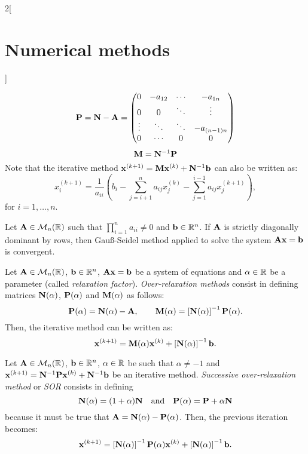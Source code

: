 \documentclass[../../../main.tex]{subfiles}
\begin{document}
\begin{multicols}{2}[\section{Numerical methods}]
\begin{definition}
\begin{equation*}
        \vb{P}=\vb{N}-\vb{A}=
        \begin{pmatrix}
            0 & -a_{12} & \cdots & -a_{1n}\\
            0 & 0 & \ddots & \vdots\\
            \vdots & \ddots & \ddots & -a_{(n-1)n}\\
            0 & \cdots & 0 & 0
        \end{pmatrix}
    \end{equation*}
    \begin{equation*}
        \vb{M}=\vb{N}^{-1}\vb{P}
    \end{equation*}
    Note that the iterative method $\vb{x}^{(k+1)}=\vb{M}\vb{x}^{(k)}+\vb{N}^{-1}\vb{b}$ can also be written as: $$x_i^{(k+1)}=\frac{1}{a_{ii}}\left(b_i-\sum_{j=i+1}^na_{ij}x_j^{(k)}-\sum_{j=1}^{i-1}a_{ij}x_j^{(k+1)}\right),$$ for $i=1,\ldots,n$.
\end{definition}
\begin{theorem}
    Let $\vb{A}\in\mathcal{M}_n(\mathbb{R})$ such that $\prod_{i=1}^na_{ii}\ne 0$ and $\vb{b}\in\mathbb{R}^n$. If $\vb{A}$ is strictly diagonally dominant by rows, then Gau\ss-Seidel method applied to solve the system $\vb{A}\vb{x}=\vb{b}$ is convergent.
\end{theorem}
\begin{method}
    Let $\vb{A}\in\mathcal{M}_n(\mathbb{R})$, $\vb{b}\in\mathbb{R}^n$, $\vb{A}\vb{x}=\vb{b}$ be a system of equations and $\alpha\in\mathbb{R}$ be a parameter (called \textit{relaxation factor}). \textit{Over-relaxation methods} consist in defining matrices $\vb{N}(\alpha)$, $\vb{P}(\alpha)$ and $\vb{M}(\alpha)$ as follows:
    $$\vb{P}(\alpha)=\vb{N}(\alpha)-\vb{A},\qquad\vb{M}(\alpha)=\left[\vb{N}(\alpha)\right]^{-1}\vb{P}(\alpha).$$
    Then, the iterative method can be written as: $$\vb{x}^{(k+1)}=\vb{M}(\alpha)\vb{x}^{(k)}+\left[\vb{N}(\alpha)\right]^{-1}\vb{b}.$$
\end{method}
\begin{method}
    Let $\vb{A}\in\mathcal{M}_n(\mathbb{R})$, $\vb{b}\in\mathbb{R}^n$, $\alpha\in\mathbb{R}$ be such that $\alpha\ne-1$ and $\vb{x}^{(k+1)}=\vb{N}^{-1}\vb{P}\vb{x}^{(k)}+\vb{N}^{-1}\vb{b}$ be an iterative method. \textit{Successive over-relaxation method} or \textit{SOR} consists in defining $$\vb{N}(\alpha)=(1+\alpha)\vb{N}\quad\text{and}\quad\vb{P}(\alpha)=\vb{P}+\alpha\vb{N}$$ because it must be true that $\vb{A}=\vb{N}(\alpha)-\vb{P}(\alpha)$. Then, the previous iteration becomes: $$\vb{x}^{(k+1)}=\left[\vb{N}(\alpha)\right]^{-1}\vb{P}(\alpha)\vb{x}^{(k)}+\left[\vb{N}(\alpha)\right]^{-1}\vb{b}.$$

\end{method}
\end{multicols}
\end{document}
